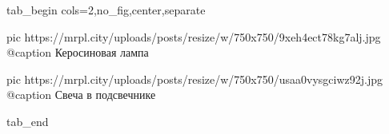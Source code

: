  
 
 
 
 

\ifcmt
  tab_begin cols=2,no_fig,center,separate

     pic https://mrpl.city/uploads/posts/resize/w/750x750/9xeh4ect78kg7alj.jpg
		 @caption Керосиновая лампа

		 pic https://mrpl.city/uploads/posts/resize/w/750x750/usaa0vysgciwz92j.jpg
		 @caption Свеча в подсвечнике

  tab_end
\fi
